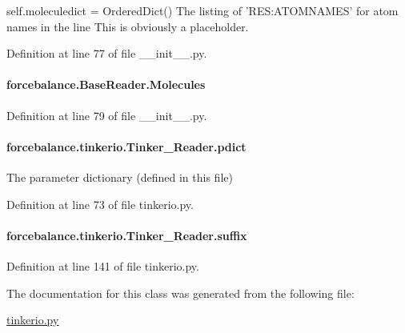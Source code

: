 self.\-moleculedict = Ordered\-Dict() The listing of 'R\-E\-S\-:A\-T\-O\-M\-N\-A\-M\-E\-S' for atom names in the line This is obviously a placeholder. 

Definition at line 77 of file \-\_\-\-\_\-init\-\_\-\-\_\-.\-py.

\hypertarget{classforcebalance_1_1BaseReader_a4369b5fb663a83b11602daa71db6862e}{
\paragraph[{Molecules}]{\setlength{\rightskip}{0pt plus 5cm}forcebalance.\-Base\-Reader.\-Molecules\hspace{0.3cm}{\ttfamily [inherited]}}}\label{classforcebalance_1_1BaseReader_a4369b5fb663a83b11602daa71db6862e}


Definition at line 79 of file \-\_\-\-\_\-init\-\_\-\-\_\-.\-py.

\hypertarget{classforcebalance_1_1tinkerio_1_1Tinker__Reader_a357973ff305fe5135067499292f32a37}{
\paragraph[{pdict}]{\setlength{\rightskip}{0pt plus 5cm}forcebalance.\-tinkerio.\-Tinker\-\_\-\-Reader.\-pdict}}\label{classforcebalance_1_1tinkerio_1_1Tinker__Reader_a357973ff305fe5135067499292f32a37}


The parameter dictionary (defined in this file) 



Definition at line 73 of file tinkerio.\-py.

\hypertarget{classforcebalance_1_1tinkerio_1_1Tinker__Reader_ad9a91824cf94ed13b39a115ebbd784c3}{
\paragraph[{suffix}]{\setlength{\rightskip}{0pt plus 5cm}forcebalance.\-tinkerio.\-Tinker\-\_\-\-Reader.\-suffix}}\label{classforcebalance_1_1tinkerio_1_1Tinker__Reader_ad9a91824cf94ed13b39a115ebbd784c3}


Definition at line 141 of file tinkerio.\-py.



The documentation for this class was generated from the following file\-:\begin{DoxyCompactItemize}
\item 
\hyperlink{tinkerio_8py}{tinkerio.\-py}\end{DoxyCompactItemize}
